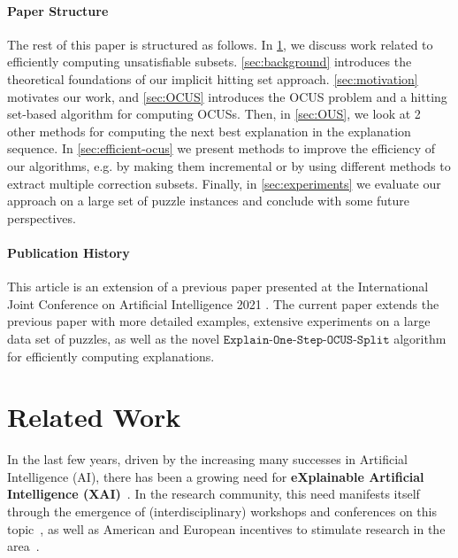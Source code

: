 \documentclass[twoside,11pt]{article}
\newcommand\mm[1]{\ensuremath{#1}\xspace}
\newcommand\call[1]{\mm{\texttt{#1}}}
\newcommand\iterativeonestep{\ensuremath{\call{Explain-One-Step-OCUS-Split}}\xspace}
\begin{document}
\paragraph{Paper Structure} The rest of this paper is structured as follows. 
In \cref{sec:related-works}, we discuss work related to efficiently computing unsatisfiable subsets. \cref{sec:background} introduces the theoretical foundations of our implicit hitting set approach. \cref{sec:motivation} motivates our work, and \cref{sec:OCUS} introduces the OCUS problem and a hitting set-based algorithm for computing OCUSs. Then, in \cref{sec:OUS}, we look at 2 other methods for computing the next best explanation in the explanation sequence. In \cref{sec:efficient-ocus} we present methods to improve the efficiency of our algorithms, e.g. by making them incremental or by using different methods to extract multiple correction subsets.
Finally, in \cref{sec:experiments} we evaluate our approach on a large set of puzzle instances and conclude with some future perspectives.

\paragraph*{Publication History} This article is an extension of a previous paper presented at the International Joint Conference on Artificial Intelligence 2021 \cite{ijcai2021}. The current paper extends the previous paper with more detailed examples, extensive experiments on a large data set of puzzles, as well as the novel \iterativeonestep algorithm for efficiently computing explanations.

\section{Related Work}\label{sec:related-works}

In the last few years, driven by the increasing many successes in Artificial Intelligence (AI), there has been a growing need for \textbf{eXplainable Artificial Intelligence (XAI)}~\cite{miller2019explanation}.
In the research community, this need manifests itself through the emergence of (interdisciplinary) workshops and conferences on this topic~, as well as American and European incentives to stimulate research in the area~. 
\end{document}
